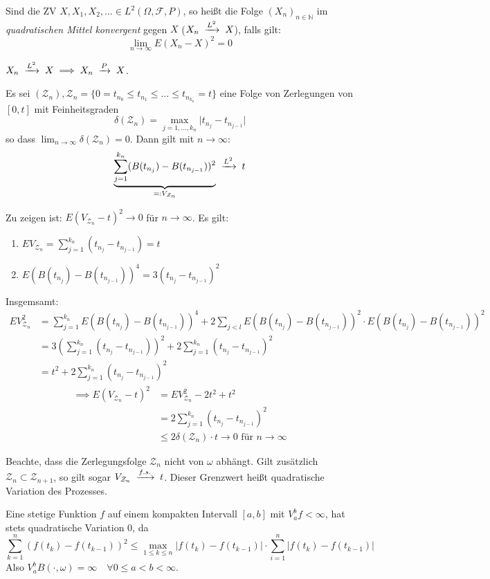 \documentclass[a4paper,twoside,DIV15,BCOR12mm]{scrbook}
\begin{document}
\begin{definition}
  Sind die ZV $X,X_1,X_2,\dots\in L^2(\Omega,\mathcal F,P)$, so heißt die Folge $(X_n)_{n\in\mathbb N}$ im \emph{quadratischen Mittel konvergent} gegen $X$ ($X_n\tomit{L^2} X$), falls gilt:
\[
\lim_{n\rightarrow\infty}E(X_n-X)^2=0
\]
\end{definition}
\begin{bemerkung}
  $X_n\tomit{L^2}X\implies X_n\tomit{P}X$.
\end{bemerkung}
\begin{satz}
  \label{Satz 11.3}
  Es sei $(\mathcal Z_n), \mathcal Z_n=\{0=t_{n_0}\leq t_{n_1}\leq\dots\leq t_{n_{k_n}}=t\}$ eine Folge von Zerlegungen von $[0,t]$ mit Feinheitsgraden
\[
\delta(\mathcal Z_n)=\max_{j=1,\dots,k_n}\vert t_{n_j}-t_{n_{j-1}}\vert
\]
so dass $\lim_{n\rightarrow\infty}\delta(\mathcal Z_n)=0$. Dann gilt mit $n\to\infty$:
\[
\underbrace{\sum_{j=1}^{k_n}(B(t_{n_j})-B(t_{n_{j-1}}))^2}_{=:V_{\mathcal Z_n}}\tomit{L^2}t
\] 
\end{satz}
\begin{beweis}
  Zu zeigen ist: $E(V_{\mathcal Z_n}-t)^2\to 0$ für $n\to\infty$. Es gilt:
  \begin{enumerate}
  \item $EV_{\mathcal Z_n}=\sum_{j=1}^{k_n}(t_{n_j}-t_{n_{j-1}})=t$
  \item $E(B(t_{n_j})-B(t_{n_{j-1}}))^4=3(t_{n_j}-t_{n_{j-1}})^2$
  \end{enumerate}
Insgemsamt:
\begin{align*}
  EV_{\mathcal Z_n}^2 &= \sum_{j=1}^{k_n}E(B(t_{n_j})-B(t_{n_{j-1}}))^4+2\sum_{j<l}E(B(t_{n_j})-B(t_{n_{j-1}}))^2\cdot E(B(t_{n_j})-B(t_{n_{j-1}}))^2 \\
&=3\left(\sum_{j=1}^{k_n}(t_{n_j}-t_{n_{j-1}})\right)^2+2\sum_{j=1}^{k_n}(t_{n_j}-t_{n_{j-1}})^2 \\
&=t^2+2\sum_{j=1}^{k_n}(t_{n_j}-t_{n_{j-1}})^2
\end{align*}
\begin{align*}
  \implies E(V_{\mathcal Z_n}-t)^2 &= EV_{\mathcal Z_n}^2-2t^2+t^2 \\
&= 2\sum_{j=1}^{k_n}(t_{n_j}-t_{n_{j-1}})^2 \\
& \leq 2\delta(\mathcal Z_n)\cdot t\to 0 \text{ für } n\to\infty
\end{align*}
\end{beweis}
\begin{bemerkung}
  Beachte, dass die Zerlegungsfolge $\mathcal Z_n$ nicht von $\omega$ abhängt. Gilt zusätzlich $\mathcal Z_n\subset\mathcal Z_{n+1}$, so gilt sogar $V_{\mathcal Z_n}\tomit{f.s.}t$. Dieser Grenzwert heißt quadratische Variation des Prozesses.
\end{bemerkung}
\begin{bemerkung}
  Eine stetige Funktion $f$ auf einem kompakten Intervall $[a,b]$ mit $V_a^bf<\infty$, hat stets quadratische Variation $0$, da
  \[
    \sum_{k=1}^n(f(t_k)-f(t_{k-1}))^2 \leq\max_{1\leq k\leq n}\vert f(t_k)-f(t_{k-1})\vert\cdot\sum_{i=1}^n\vert f(t_k)-f(t_{k-1})\vert
  \]
Also $V_a^b B(\cdot,\omega)=\infty\quad\forall 0\leq a<b<\infty$.
\end{bemerkung}
\end{document}
